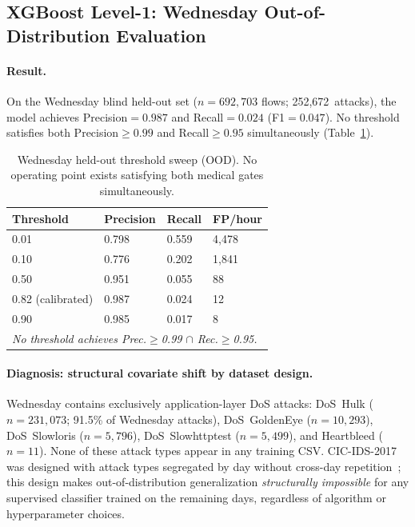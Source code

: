 \documentclass[11pt,a4paper]{article}
\begin{document}
    \subsection{XGBoost Level-1: Wednesday Out-of-Distribution Evaluation}
    \label{sec:eval:xgboost:ood}

    \paragraph{Result.}
    On the Wednesday blind held-out set ($n=692{,}703$ flows; 252,672~attacks), the model
    achieves Precision$=0.987$ and Recall$=0.024$ (F1$=0.047$). No threshold satisfies
    both Precision$\geq0.99$ and Recall$\geq0.95$ simultaneously
    (Table~\ref{tab:xgboost_ood}).

    \begin{table}[h]
        \centering
        \caption{Wednesday held-out threshold sweep (OOD). No operating point exists
        satisfying both medical gates simultaneously.}
        \label{tab:xgboost_ood}
        \begin{tabular}{llll}
            \toprule
            \textbf{Threshold} & \textbf{Precision} & \textbf{Recall} & \textbf{FP/hour} \\
            \midrule
            0.01 & 0.798 & 0.559 & 4,478 \\
            0.10 & 0.776 & 0.202 & 1,841 \\
            0.50 & 0.951 & 0.055 & 88    \\
            0.82 (calibrated) & 0.987 & 0.024 & 12 \\
            0.90 & 0.985 & 0.017 & 8     \\
            \midrule
            \multicolumn{4}{l}{\emph{No threshold achieves Prec.$\geq$0.99 $\cap$ Rec.$\geq$0.95.}} \\
            \bottomrule
        \end{tabular}
    \end{table}

    \paragraph{Diagnosis: structural covariate shift by dataset design.}
    Wednesday contains exclusively application-layer DoS attacks: DoS~Hulk
    ($n=231{,}073$; 91.5\% of Wednesday attacks), DoS~GoldenEye ($n=10{,}293$),
    DoS~Slowloris ($n=5{,}796$), DoS~Slowhttptest ($n=5{,}499$), and Heartbleed ($n=11$).
    None of these attack types appear in any training CSV. CIC-IDS-2017 was designed with
    attack types segregated by day without cross-day repetition~\cite{sharafaldin2018};
    this design makes out-of-distribution generalization \emph{structurally impossible}
    for any supervised classifier trained on the remaining days, regardless of algorithm
    or hyperparameter choices.
\end{document}
